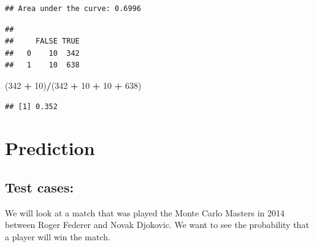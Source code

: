\documentclass[]{article}
\newenvironment{Shaded}{\begin{snugshade}}{\end{snugshade}}
\newcommand{\DecValTok}[1]{\textcolor[rgb]{0.00,0.00,0.81}{#1}}
\newcommand{\FloatTok}[1]{\textcolor[rgb]{0.00,0.00,0.81}{#1}}
\newcommand{\KeywordTok}[1]{\textcolor[rgb]{0.13,0.29,0.53}{\textbf{#1}}}
\newcommand{\NormalTok}[1]{#1}
\newcommand{\OperatorTok}[1]{\textcolor[rgb]{0.81,0.36,0.00}{\textbf{#1}}}
\newcommand{\StringTok}[1]{\textcolor[rgb]{0.31,0.60,0.02}{#1}}
\begin{document}
\begin{Shaded}
\end{Shaded}

\begin{verbatim}
## Area under the curve: 0.6996
\end{verbatim}

\begin{Shaded}
\end{Shaded}

\begin{verbatim}
##    
##     FALSE TRUE
##   0    10  342
##   1    10  638
\end{verbatim}

\begin{Shaded}
\begin{Highlighting}[]
\NormalTok{(}\DecValTok{342} \OperatorTok{+}\StringTok{ }\DecValTok{10}\NormalTok{)}\OperatorTok{/}\NormalTok{(}\DecValTok{342} \OperatorTok{+}\StringTok{ }\DecValTok{10} \OperatorTok{+}\StringTok{ }\DecValTok{10} \OperatorTok{+}\StringTok{ }\DecValTok{638}\NormalTok{)}
\end{Highlighting}
\end{Shaded}

\begin{verbatim}
## [1] 0.352
\end{verbatim}

\hypertarget{prediction}{%
\section{Prediction}\label{prediction}}

\hypertarget{test-cases}{%
\subsection{Test cases:}\label{test-cases}}

We will look at a match that was played the Monte Carlo Masters in 2014
between Roger Federer and Novak Djokovic. We want to see the probability
that a player will win the match.
\end{document}

